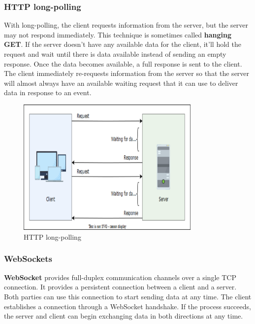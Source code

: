 \subsubsection{HTTP long-polling}\label{5mssFgfSXzfw1y8hNKUGN}

With long-polling, the client requests information from the server, but the server may not respond immediately. This technique is sometimes called \textbf{hanging GET}. If the server doesn't have any available data for the client, it'll hold the request and wait until there is data available instead of sending an empty response. Once the data becomes available, a full response is sent to the client. The client immediately re-requests information from the server so that the server will almost always have an available waiting request that it can use to deliver data in response to an event.

\begin{figure}[htbp]
 \centering
 \includegraphics[width=0.8\textwidth]{Images/chapter_1/section_4705505809661952/5275089138745344.png}
 \caption{HTTP long-polling}
\end{figure}

\subsubsection{WebSockets}\label{a6a8mQ97j6bQeKXlTtNmQ}

\textbf{WebSocket} provides full-duplex communication channels over a single TCP connection. It provides a persistent connection between a client and a server. Both parties can use this connection to start sending data at any time. The client establishes a connection through a WebSocket handshake. If the process succeeds, the server and client can begin exchanging data in both directions at any time.


